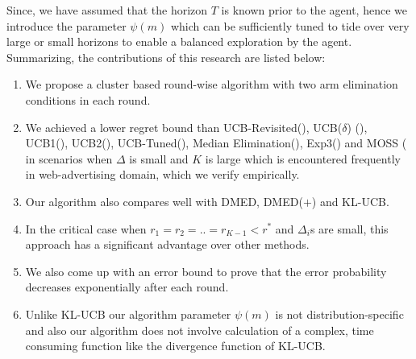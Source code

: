 	Since, we have assumed that the horizon $T$ is known prior to the agent, hence we introduce the parameter $\psi(m)$ which can be sufficiently tuned to tide over very large or small horizons to enable a balanced exploration by the agent.
\newline
Summarizing, the contributions of this research are listed below:

\begin{enumerate}
\item We propose a cluster based round-wise algorithm with two arm elimination conditions in each round.
\item We achieved a lower regret bound than UCB-Revisited(\cite{auer2010ucb}), UCB($\delta$) (\cite{abbasi2011improved}), UCB1(\cite{auer2002finite}), UCB2(\cite{auer2002finite}), UCB-Tuned(\cite{auer2002finite}), Median Elimination(\cite{even2006action}),  Exp3(\cite{auer2002nonstochastic}) and MOSS (\cite{audibert2009minimax} in scenarios when $\Delta$ is small and $K$ is large which is encountered frequently in web-advertising domain, which we verify empirically.
\item Our algorithm also compares well with DMED, DMED($+$) and KL-UCB.
\item In the critical case when $r_{1}=r_{2}=..=r_{K-1}<r^{*}$ and $\Delta_{i}$s are small, this approach has a significant advantage over other methods.
\item We also come up with an error bound to prove that the error probability decreases exponentially after each round.
\item Unlike KL-UCB our algorithm parameter $\psi(m)$ is not distribution-specific and also our algorithm does not involve calculation of a complex, time consuming function like the divergence function of KL-UCB.
\end{enumerate}


